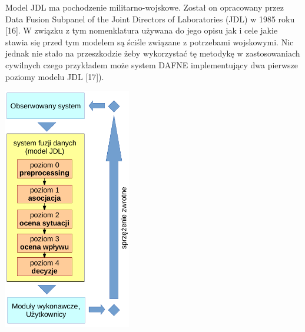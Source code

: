 \par{
Model JDL ma pochodzenie militarno-wojskowe. Został on opracowany przez Data Fusion Subpanel of the Joint Directors of Laboratories (JDL) w 1985 roku [16]. W związku z tym nomenklatura używana do jego opisu jak i cele jakie stawia się przed tym modelem są ściśle związane z potrzebami wojskowymi. Nic jednak nie stało na przeszkodzie żeby wykorzystać tę metodykę w zastosowaniach cywilnych czego przykładem może system DAFNE implementujący dwa pierwsze poziomy modelu JDL [17]).
}
\par{
\begin{center}
\includegraphics[width=15em,keepaspectratio]{img/jdl}
\end{center}
}
